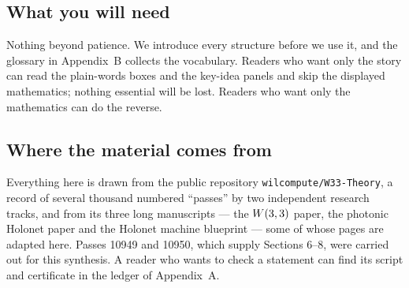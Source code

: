 \subsection*{What you will need}

Nothing beyond patience. We introduce every structure before we use it, and the
glossary in Appendix~B collects the vocabulary. Readers who want only the story can
read the plain-words boxes and the key-idea panels and skip the displayed mathematics;
nothing essential will be lost. Readers who want only the mathematics can do the
reverse.

\subsection*{Where the material comes from}

Everything here is drawn from the public repository \texttt{wilcompute/W33-Theory},
a record of several thousand numbered ``passes'' by two independent research tracks,
and from its three long manuscripts --- the $W(3,3)$ paper, the photonic Holonet paper and
the Holonet machine blueprint --- some of whose pages are adapted here. Passes 10949 and
10950, which supply Sections 6--8, were carried out for this synthesis. A reader who
wants to check a statement can find its script and certificate in the ledger of
Appendix~A.
